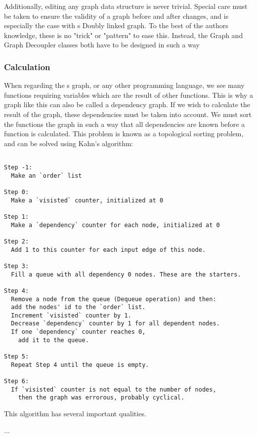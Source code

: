 Additionally, editing any graph data structure is never trivial. 
Special care must be taken to ensure the validity of a graph before and after changes, and is especially the case with \geofront{}s Doubly linked graph. 
To the best of the authors knowledge, these is no "trick" or "pattern" to ease this. Instead, the Graph and Graph Decoupler classes both have to be designed in such a way 

\subsubsection*{Calculation}
When regarding the \geofront{}s graph, or any other programming language, we see many functions requiring variables which are the result of other functions. 
This is why a graph like this can also be called a dependency graph. 
If we wish to calculate the result of the graph, these dependencies must be taken into account. We must sort the functions the graph in such a way that all dependencies are known before a function is calculated.
This problem is known as a topological sorting problem, and can be solved using Kahn's algorithm: 

\begin{lstlisting}

Step -1: 
  Make an `order` list

Step 0: 
  Make a `visisted` counter, initialized at 0

Step 1: 
  Make a `dependency` counter for each node, initialized at 0

Step 2: 
  Add 1 to this counter for each input edge of this node.

Step 3: 
  Fill a queue with all dependency 0 nodes. These are the starters.

Step 4: 
  Remove a node from the queue (Dequeue operation) and then:
  add the nodes' id to the `order` list.
  Increment `visisted` counter by 1.
  Decrease `dependency` counter by 1 for all dependent nodes.
  If one `dependency` counter reaches 0, 
    add it to the queue.

Step 5: 
  Repeat Step 4 until the queue is empty.

Step 6: 
  If `visisted` counter is not equal to the number of nodes, 
    then the graph was errorous, probably cyclical. 

\end{lstlisting}

This algorithm has several important qualities. 

...

